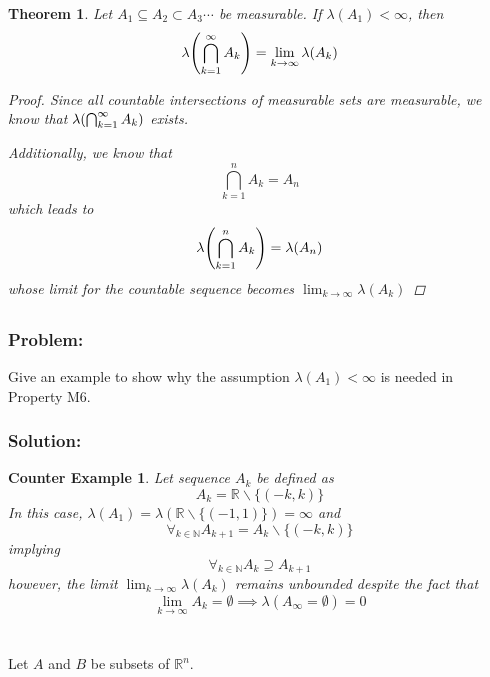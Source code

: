 \documentclass[]{article}
\newcommand{\R}{\mathbb{R}}
\newcommand{\N}{\mathbb{N}}
\newtheorem{theorem}{Theorem}
\newtheorem{counterExample}{Counter Example}
\begin{document}
\begin{theorem}
    Let $A_1 \subseteq A_2 \subset A_3 \cdots$ be measurable. 
    If $\lambda(A_1) < \infty$, then \[
        \lambda \qty(
            \bigcap_{k=1}^{\infty} A_k
        ) = \lim_{k \to \infty} \lambda(A_k)
    \]
    \begin{proof}
        Since all countable intersections of measurable sets are measurable, 
        we know that $\lambda\qty(\bigcap_{k=1}^{\infty} A_k)$ exists.
        
        Additionally, we know that \[
            \bigcap_{k=1}^{n} A_k = A_n
        \] which leads to \[
            \lambda\qty(\bigcap_{k=1}^n A_k) = \lambda(A_n)
        \] whose limit for the countable sequence becomes $\lim_{k \to \infty} \lambda(A_k)$
    \end{proof}
\end{theorem}

\subsection{}
\subsubsection*{Problem:}
Give an example to show why the assumption $\lambda(A_1) < \infty$ is needed in Property M6.
\subsubsection*{Solution:}
\begin{counterExample}
    Let sequence $A_k$ be defined as \[
        A_k = \R \backslash \{(-k,k)\}
    \] In this case, $\lambda(A_1) = \lambda(\R \backslash \{(-1,1)\}) = \infty$ and \[
        \forall_{k \in \N} A_{k+1} = A_{k} \backslash \{(-k, k)\}
    \] implying \[
        \forall_{k \in \N} A_{k} \supseteq A_{k+1}
    \] however, the limit $\lim_{k \to \infty} \lambda(A_k)$ remains unbounded despite the fact that \[
        \lim_{k \to \infty} A_k = \emptyset \implies \lambda(A_\infty = \emptyset) = 0
    \]
\end{counterExample}

\newpage
\section{}
Let $A$ and $B$ be subsets of $\R^n$.
\subsection{}
\end{document}
